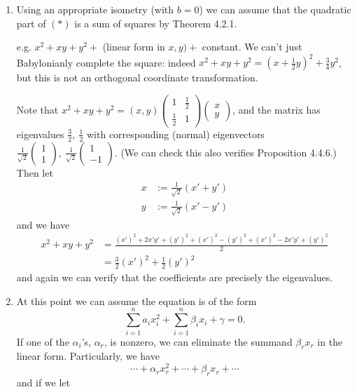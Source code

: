 \documentclass[a4paper]{article}
\theoremstyle{definition}
\begin{document}
\begin{enumerate}
    \item Using an appropriate isometry (with $b=0$) we can assume that the quadratic part of $(\ast)$ is a sum of squares by Theorem 4.2.1.
    
    e.g. $x^2+xy+y^2+$ (linear form in $x,y)+$ constant. We can't just Babylonianly complete the square: indeed $x^2+xy+y^2=\left(x+\frac12 y\right)^2 +\frac34 y^2$, but this is not an orthogonal coordinate transformation.
    
    Note that $x^2+xy+y^2=(x,y) \begin{pmatrix}
    1 & \frac12 \\ \frac12 & 1
    \end{pmatrix} \begin{pmatrix}
    x \\ y
    \end{pmatrix}$, and the matrix has eigenvalues $\frac32,\ \frac12$ with corresponding (normal) eigenvectors $\frac{1}{\sqrt 2} \begin{pmatrix}
    1 \\ 1
    \end{pmatrix},\ \frac{1}{\sqrt 2} \begin{pmatrix}
    1 \\ -1
    \end{pmatrix}$. (We can check this also verifies Proposition 4.4.6.) Then let
    \[
    \begin{aligned}
    x&:=\frac{1}{\sqrt 2} (x'+y') \\
    y&:=\frac{1}{\sqrt 2} (x'-y')
    \end{aligned}
    \] and we have
    \[
    \begin{aligned}
    x^2+xy+y^2 &= \frac{\left(x'\right)^2+2x'y'+\left(y'\right)^2+\left(x'\right)^2-\left(y'\right)^2+\left(x'\right)^2-2x'y'+\left(y'\right)^2}{2} \\
    &= \frac{3}{2}\left(x'\right)^2+\frac{1}{2}\left(y'\right)^2
    \end{aligned}
    \]
    and again we can verify that the coefficients are precisely the eigenvalues.
    \item At this point we can assume the equation is of the form
    \[
    \sum_{i=1}^n a_i x_i^2 + \sum_{i=1}^n \beta_i x_i + \gamma =0 .
    \]
    If one of the $\alpha_i$'s, $\alpha_r$, is nonzero, we can eliminate the summand $\beta_r x_r$ in the linear form. Particularly, we have
    \[
    \cdots + \alpha_r x_r^2 + \cdots + \beta_r x_r +\cdots
    \]
    and if we let

\end{enumerate}
\end{document}
